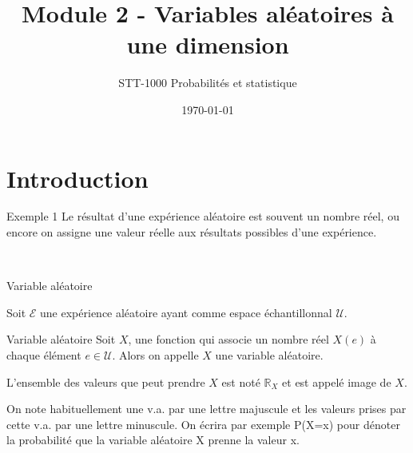 \documentclass{BeamerTemplate}
\title{Module 2 - Variables aléatoires à une dimension}
\subtitle{STT-1000 Probabilités et statistique}
\date{\today}
\begin{document}
\begin{frame}[t]
  \titlepage
\end{frame}

\section{Introduction}
\begin{frame}[t]{Exemple 1}
Le résultat d'une expérience aléatoire est souvent un nombre réel, ou encore on assigne une valeur réelle aux résultats possibles d'une expérience.

\medskip
{\ }

\end{frame}

\begin{frame}{Variable aléatoire}

Soit $\mathcal{E}$ une expérience aléatoire ayant
  comme espace échantillonnal $\mathcal{U}$.

 \begin{Boite}{Variable aléatoire}
Soit $X$, une fonction  qui associe un nombre réel $X(e)$ à chaque élément
  $e\in \mathcal{U}$. Alors on appelle $X$ une \alert{variable aléatoire}.

\medskip

L'ensemble des valeurs que peut prendre $X$ est noté   $\mathbb{R}_X$ et est appelé \alert{image de $X$}.
 \end{Boite}
On note habituellement une v.a. par une lettre majuscule et les valeurs prises par cette v.a. par une lettre minuscule. On écrira par exemple P(X=x) pour dénoter la probabilité que la variable aléatoire X prenne la valeur x.

\end{frame}
\end{document}
